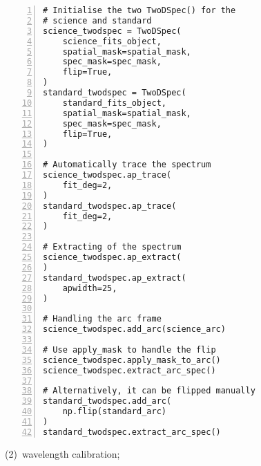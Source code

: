 \begin{minipage}{0.45\linewidth}
\begin{Verbatim}[frame=topline,numbers=left,label=Gemini/GMOS,framesep=3mm]
# Initialise the two TwoDSpec() for the
# science and standard
science_twodspec = TwoDSpec(
    science_fits_object,
    spatial_mask=spatial_mask,
    spec_mask=spec_mask,
    flip=True,
)
standard_twodspec = TwoDSpec(
    standard_fits_object,
    spatial_mask=spatial_mask,
    spec_mask=spec_mask,
    flip=True,
)

# Automatically trace the spectrum
science_twodspec.ap_trace(
    fit_deg=2,
)
standard_twodspec.ap_trace(
    fit_deg=2,
)

# Extracting of the spectrum
science_twodspec.ap_extract(
)
standard_twodspec.ap_extract(
    apwidth=25,
)

# Handling the arc frame
science_twodspec.add_arc(science_arc)

# Use apply_mask to handle the flip
science_twodspec.apply_mask_to_arc()
science_twodspec.extract_arc_spec()

# Alternatively, it can be flipped manually
standard_twodspec.add_arc(
    np.flip(standard_arc)
)
standard_twodspec.extract_arc_spec()
\end{Verbatim}
\end{minipage}

\clearpage

(2)~wavelength calibration;

\vspace*{1em}

